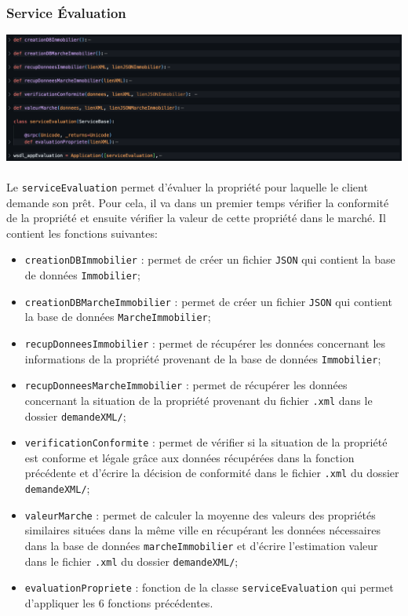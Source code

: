 \documentclass{article}
\begin{document}
    \subsubsection{Service Évaluation}
      \includegraphics[width=\textwidth]{Images/7.2/serviceEvaluation.png}\\
      \\
      Le \texttt{serviceEvaluation} permet d'évaluer la propriété pour laquelle le client demande son prêt. Pour cela, il va dans un premier temps vérifier la conformité de la propriété et ensuite vérifier la valeur de cette propriété dans le marché. Il contient les fonctions suivantes:
      \begin{itemize}
          \item \texttt{creationDBImmobilier} : permet de créer un fichier \texttt{JSON} qui contient la base de données \texttt{Immobilier};
          \item \texttt{creationDBMarcheImmobilier} : permet de créer un fichier \texttt{JSON} qui contient la base de données \texttt{MarcheImmobilier};
          \item \texttt{recupDonneesImmobilier} : permet de récupérer les données concernant les informations de la propriété provenant de la base de données \texttt{Immobilier}; 
          \item \texttt{recupDonneesMarcheImmobilier} : permet de récupérer les données concernant la situation de la propriété provenant du fichier \texttt{.xml} dans le dossier \texttt{demandeXML/};
          \item \texttt{verificationConformite} : permet de vérifier si la situation de la propriété est conforme et légale grâce aux données récupérées dans la fonction précédente et d'écrire la décision de conformité dans le fichier \texttt{.xml} du dossier \texttt{demandeXML/};
          \item \texttt{valeurMarche} : permet de calculer la moyenne des valeurs des propriétés similaires situées dans la même ville en récupérant les données nécessaires dans la base de données \texttt{marcheImmobilier} et d'écrire l'estimation valeur dans le fichier \texttt{.xml} du dossier \texttt{demandeXML/};
          \item \texttt{evaluationPropriete} : fonction de la classe \texttt{serviceEvaluation} qui permet d'appliquer les 6 fonctions précédentes.
      \end{itemize}
\end{document}

